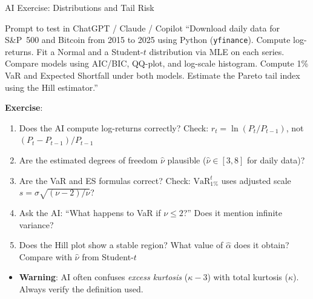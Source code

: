 \documentclass[9pt, aspectratio=169, t]{beamer}
\theoremstyle{definition}
\newenvironment{cminipage}[1]{%
    \par\noindent\hfill\begin{minipage}{#1}\ignorespaces
}{%
    \end{minipage}\hfill\null\par
}
\begin{document}
\begin{frame}[shrink=3]{AI Exercise: Distributions and Tail Risk}
    \begin{cminipage}{0.95\textwidth}
    \begin{block}{\footnotesize Prompt to test in ChatGPT / Claude / Copilot}
        {\small
        ``Download daily data for S\&P~500 and Bitcoin from 2015 to 2025 using Python (\texttt{yfinance}).
        Compute log-returns. Fit a Normal and a Student-$t$ distribution via MLE on each series.
        Compare models using AIC/BIC, QQ-plot, and log-scale histogram.
        Compute 1\% VaR and Expected Shortfall under both models.
        Estimate the Pareto tail index using the Hill estimator.''}
    \end{block}
    \vspace{-1mm}
    {\small
    \textbf{Exercise}:
    \begin{enumerate}
        \item Does the AI compute log-returns correctly? Check: $r_t = \ln(P_t / P_{t-1})$, not $(P_t - P_{t-1})/P_{t-1}$
        \item Are the estimated degrees of freedom $\hat{\nu}$ plausible ($\hat{\nu} \in [3, 8]$ for daily data)?
        \item Are the VaR and ES formulas correct? Check: $\text{VaR}^{t}_{1\%}$ uses adjusted scale $s = \sigma\sqrt{(\nu-2)/\nu}$?
        \item Ask the AI: ``What happens to VaR if $\nu \leq 2$?'' Does it mention infinite variance?
        \item Does the Hill plot show a stable region? What value of $\hat{\alpha}$ does it obtain? Compare with $\hat{\nu}$ from Student-$t$
    \end{enumerate}
    }
    \vspace{-1mm}
    \begin{alertblock}{}
        {\small
        \begin{itemize}\setlength{\itemsep}{0pt}
            \item \textbf{Warning}: AI often confuses \textit{excess kurtosis} ($\kappa - 3$) with total kurtosis ($\kappa$). Always verify the definition used.
        \end{itemize}
        }
    \end{alertblock}
    \end{cminipage}
\end{frame}

\end{document}
